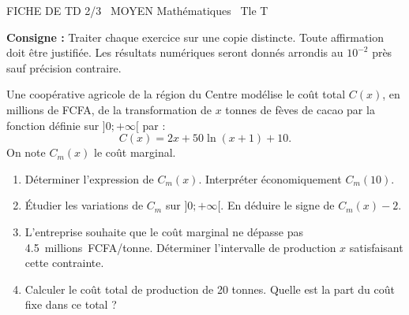 \documentclass[11pt]{article}
\begin{document}
\begin{tcolorbox}[enhanced,colback=popink,colframe=popink,arc=10pt,boxrule=0pt,left=12pt,right=12pt,top=9pt,bottom=9pt]
{\color{white}\popxbold\small FICHE DE TD 2/3 \textbullet\ MOYEN \hfill Mathématiques \textbullet\ Tle T\par}
\end{tcolorbox}
\vspace{4pt}
\noindent \textbf{Consigne :} Traiter chaque exercice sur une copie distincte. Toute affirmation doit être justifiée. Les résultats numériques seront donnés arrondis au $10^{-2}$ près sauf précision contraire.

\begin{exercice}
Une coopérative agricole de la région du Centre modélise le coût total $C(x)$, en millions de FCFA, de la transformation de $x$ tonnes de fèves de cacao par la fonction définie sur $]0; +\infty[$ par :
\[ C(x) = 2x + 50\ln(x+1) + 10. \]
On note $C_m(x)$ le coût marginal.
\begin{enumerate}
    \item Déterminer l'expression de $C_m(x)$. Interpréter économiquement $C_m(10)$.
    \item Étudier les variations de $C_m$ sur $]0; +\infty[$. En déduire le signe de $C_m(x) - 2$.
    \item L'entreprise souhaite que le coût marginal ne dépasse pas \SI{4,5}{millions.FCFA/tonne}. Déterminer l'intervalle de production $x$ satisfaisant cette contrainte.
    \item Calculer le coût total de production de 20 tonnes. Quelle est la part du coût fixe dans ce total ?
\end{enumerate}
\end{exercice}
\end{document}
